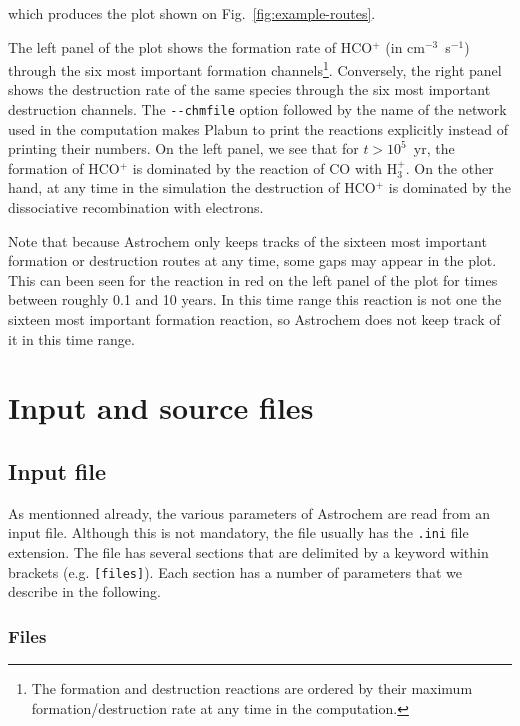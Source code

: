 \documentclass[a4paper,12pt]{article}
\begin{document}
\noindent
which produces the plot shown on Fig.~\ref{fig:example-routes}.

The left panel of the plot shows the formation rate of HCO$^{+}$ (in
cm$^{-3}$~s$^{-1}$) through the six most important formation
channels\footnote{The formation and destruction reactions are ordered
  by their maximum formation/destruction rate at any time in the
  computation.}. Conversely, the right panel shows the destruction
rate of the same species through the six most important destruction
channels. The \verb=--chmfile= option followed by the name of the
network used in the computation makes Plabun to print the reactions
explicitly instead of printing their numbers. On the left panel, we
see that for $t > 10^{5}$~yr, the formation of HCO$^{+}$ is dominated
by the reaction of CO with H$_{3}^{+}$. On the other hand, at any time
in the simulation the destruction of HCO$^{+}$ is dominated by the
dissociative recombination with electrons.

Note that because Astrochem only keeps tracks of the sixteen most
important formation or destruction routes at any time, some gaps may
appear in the plot. This can been seen for the reaction in red on the
left panel of the plot for times between roughly 0.1 and 10 years. In
this time range this reaction is not one the sixteen most important
formation reaction, so Astrochem does not keep track of it in this
time range.

\section{Input and source files}
\label{sec:input-source-files}

\subsection{Input file}
\label{sec:input-file}

As mentionned already, the various parameters of Astrochem are read
from an input file. Although this is not mandatory, the file usually
has the \verb=.ini= file extension. The file has several sections that
are delimited by a keyword within brackets (e.g. \verb=[files]=). Each
section has a number of parameters that we describe in the following.

\subsubsection{Files}
\label{sec:files}
\end{document}
